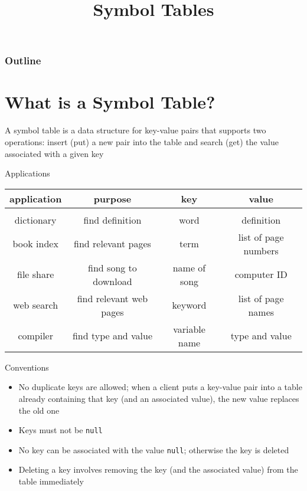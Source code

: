 \documentclass[8pt,a4paper,compress]{beamer}
\title{Symbol Tables}
\date{}
\begin{document}
\begin{frame}
\vfill
\titlepage
\end{frame}

\begin{frame}
\frametitle{Outline}
\tableofcontents
\end{frame}

\section{What is a Symbol Table?}
\begin{frame}[fragile]
\pause

A symbol table is a data structure for key-value pairs that supports two operations: insert (put) a new pair into the table and search (get) the value associated with a given key

\pause
\bigskip

Applications 
\begin{center}
\begin{tabular}{cccc}
application & purpose & key & value \\ \hline \\
dictionary & find definition & word & definition \\
book index & find relevant pages & term & list of page numbers \\
file share & find song to download & name of song & computer ID \\
web search & find relevant web pages & keyword & list of page names \\
compiler & find type and value & variable name & type and value \\
\end{tabular} 
\end{center}
\end{frame}

\begin{frame}[fragile]
\pause

Conventions
\begin{itemize}
\item No duplicate keys are allowed; when a client puts a key-value pair into a table already containing that key (and an associated value), the new value replaces the old one

\item Keys must not be \lstinline{null}

\item No key can be associated with the value \lstinline{null}; otherwise the key is deleted

\item Deleting a key involves removing the key (and the associated value) from the table immediately
\end{itemize}
\end{frame}
\end{document}
